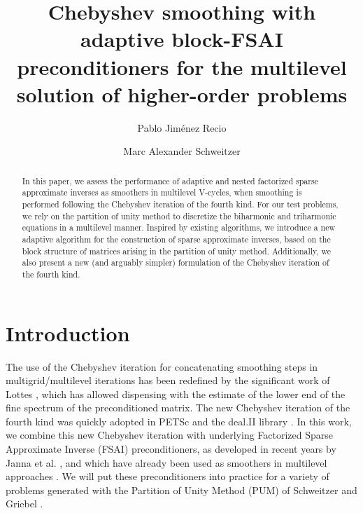 \documentclass[a4paper]{article}
\theoremstyle{plain}
\theoremstyle{definition}
\theoremstyle{remark}
\begin{document}
\title{Chebyshev smoothing with adaptive block-FSAI preconditioners for the multilevel solution of higher-order problems}
\date{}

\author[1,2]{Pablo Jim\'{e}nez Recio}
\author[1,2]{Marc Alexander Schweitzer}


\renewcommand\Affilfont{\itshape\small}

\maketitle

\begin{abstract}
	In this paper, we assess the performance of adaptive and nested factorized sparse approximate inverses as smoothers in multilevel V-cycles, when smoothing is performed following the Chebyshev iteration of the fourth kind. For our test problems, we rely on the partition of unity method to discretize the biharmonic and triharmonic equations in a multilevel manner. Inspired by existing algorithms, we introduce a new adaptive algorithm for the construction of sparse approximate inverses, based on the block structure of matrices arising in the partition of unity method. Additionally, we also present a new (and arguably simpler) formulation of the Chebyshev iteration of the fourth kind.
\end{abstract}

\section{Introduction}\label{sec:intro}

The use of the Chebyshev iteration for concatenating smoothing steps in multigrid/multilevel iterations has been redefined by the significant work of Lottes \cite{Lottes2023}, which has allowed dispensing with the estimate of the lower end of the fine spectrum of the preconditioned matrix. The new Chebyshev iteration of the fourth kind was quickly adopted in PETSc and the deal.II library \cite{Arndt2023}. In this work, we combine this new Chebyshev iteration with underlying Factorized Sparse Approximate Inverse (FSAI) preconditioners, as developed in recent years by Janna et al. \cite{Janna2010, Janna2011, Janna2015}, and which have already been used as smoothers in multilevel approaches \cite{PaludettoMagri2019, Janna2025}. We will put these preconditioners into practice for a variety of problems generated with the Partition of Unity Method (PUM) of Schweitzer and Griebel \cite{Schweitzer2003, Griebel2002}.
\end{document}
